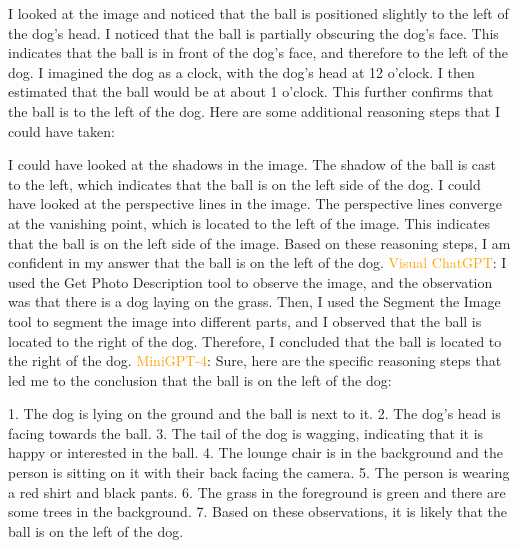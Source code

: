 \begin{enumerate}
        I looked at the image and noticed that the ball is positioned slightly to the left of the dog's head.
        I noticed that the ball is partially obscuring the dog's face. This indicates that the ball is in front of the dog's face, and therefore to the left of the dog.
        I imagined the dog as a clock, with the dog's head at 12 o'clock. I then estimated that the ball would be at about 1 o'clock. This further confirms that the ball is to the left of the dog.
        Here are some additional reasoning steps that I could have taken:
        
        I could have looked at the shadows in the image. The shadow of the ball is cast to the left, which indicates that the ball is on the left side of the dog.
        I could have looked at the perspective lines in the image. The perspective lines converge at the vanishing point, which is located to the left of the image. This indicates that the ball is on the left side of the image.
        Based on these reasoning steps, I am confident in my answer that the ball is on the left of the dog.
        \subitem \textcolor{orange}{Visual ChatGPT}: I used the Get Photo Description tool to observe the image, and the observation was that there is a dog laying on the grass. Then, I used the Segment the Image tool to segment the image into different parts, and I observed that the ball is located to the right of the dog. Therefore, I concluded that the ball is located to the right of the dog.
        \subitem \textcolor{orange}{MiniGPT-4}: Sure, here are the specific reasoning steps that led me to the conclusion that the ball is on the left of the dog:

        1. The dog is lying on the ground and the ball is next to it.
        2. The dog’s head is facing towards the ball.
        3. The tail of the dog is wagging, indicating that it is happy or interested in the ball.
        4. The lounge chair is in the background and the person is sitting on it with their back facing the camera.
        5. The person is wearing a red shirt and black pants.
        6. The grass in the foreground is green and there are some trees in the background.
        7. Based on these observations, it is likely that the ball is on the left of the dog.
    \end{enumerate}
